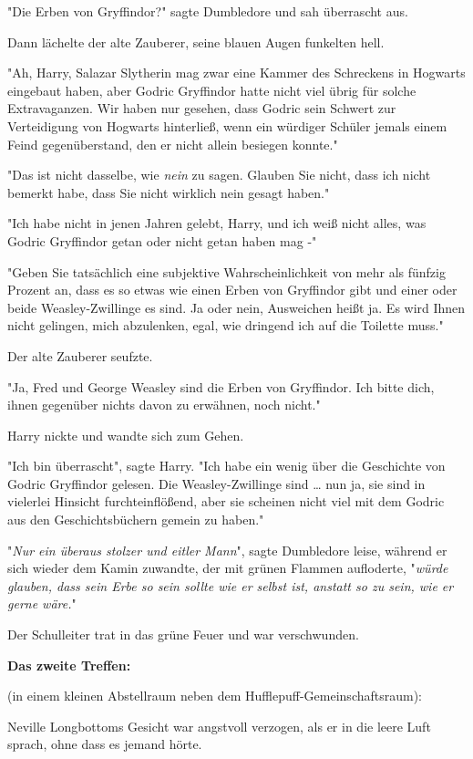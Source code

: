 {"Die Erben von Gryffindor?" sagte Dumbledore und sah überrascht aus.

Dann lächelte der alte Zauberer, seine blauen Augen funkelten hell.

"Ah, Harry, Salazar Slytherin mag zwar eine Kammer des Schreckens in Hogwarts eingebaut haben, aber Godric Gryffindor hatte nicht viel übrig für solche Extravaganzen. Wir haben nur gesehen, dass Godric sein Schwert zur Verteidigung von Hogwarts hinterließ, wenn ein würdiger Schüler jemals einem Feind gegenüberstand, den er nicht allein besiegen konnte."

"Das ist nicht dasselbe, wie \emph{nein} zu sagen. Glauben Sie nicht, dass ich nicht bemerkt habe, dass Sie nicht wirklich nein gesagt haben."

"Ich habe nicht in jenen Jahren gelebt, Harry, und ich weiß nicht alles, was Godric Gryffindor getan oder nicht getan haben mag -"

"Geben Sie tatsächlich eine subjektive Wahrscheinlichkeit von mehr als fünfzig Prozent an, dass es so etwas wie einen Erben von Gryffindor gibt und einer oder beide Weasley-Zwillinge es sind. Ja oder nein, Ausweichen heißt ja. Es wird Ihnen nicht gelingen, mich abzulenken, egal, wie dringend ich auf die Toilette muss."

Der alte Zauberer seufzte.

"Ja, Fred und George Weasley sind die Erben von Gryffindor. Ich bitte dich, ihnen gegenüber nichts davon zu erwähnen, noch nicht."

Harry nickte und wandte sich zum Gehen.

"Ich bin überrascht", sagte Harry. "Ich habe ein wenig über die Geschichte von Godric Gryffindor gelesen. Die Weasley-Zwillinge sind … nun ja, sie sind in vielerlei Hinsicht furchteinflößend, aber sie scheinen nicht viel mit dem Godric aus den Geschichtsbüchern gemein zu haben."

"\emph{Nur ein überaus stolzer und eitler Mann}", sagte Dumbledore leise, während er sich wieder dem Kamin zuwandte, der mit grünen Flammen aufloderte, "\emph{würde glauben, dass sein Erbe so sein sollte wie er selbst ist, anstatt so zu sein, wie er gerne wäre.}"

Der Schulleiter trat in das grüne Feuer und war verschwunden.

\textbf{Das zweite Treffen:}

(in einem kleinen Abstellraum neben dem Hufflepuff-Gemeinschaftsraum):

Neville Longbottoms Gesicht war angstvoll verzogen, als er in die leere Luft sprach, ohne dass es jemand hörte.

}
